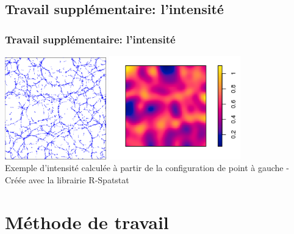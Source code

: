 \documentclass{beamer}
\theoremstyle{remark}
\theoremstyle{plain}
\begin{document}
\subsection{Travail supplémentaire: l'intensité}
\begin{frame}
    \frametitle{Travail supplémentaire: l'intensité}
      \begin{center}
        \includegraphics[width=4.4cm]{images/exempleConfiguration.png}
        \hspace{0.5cm}
        \includegraphics[width=5.7cm]{images/intensiteSpatstat.png}\\
        Exemple d'intensité calculée à partir de la configuration de point à gauche - Créée avec la librairie R-Spatstat%
      \end{center}
    
\end{frame}


\section{Méthode de travail}
\label{sec:partie3}
\end{document}
